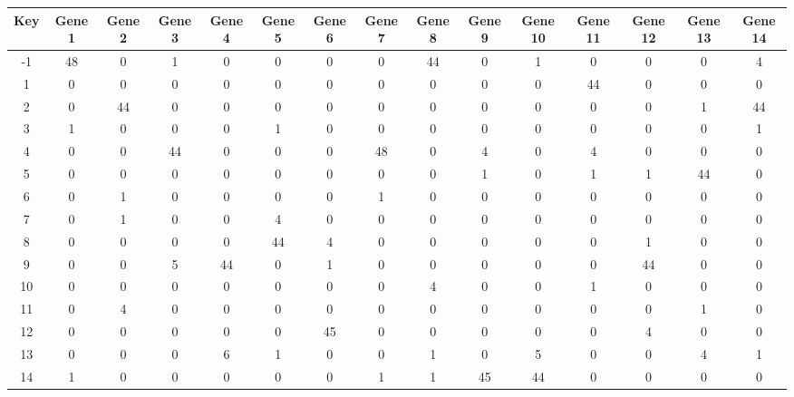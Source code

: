\begin{tabular}{|c|c|c|c|c|c|c|c|c|c|c|c|c|c|c|}
\hline
Key & Gene 1 & Gene 2 & Gene 3 & Gene 4 & Gene 5 & Gene 6 & Gene 7 & Gene 8 & Gene 9 & Gene 10 & Gene 11 & Gene 12 & Gene 13 & Gene 14 \\
\hline
-1 & 48 & 0 & 1 & 0 & 0 & 0 & 0 & 44 & 0 & 1 & 0 & 0 & 0 & 4 \\
1 & 0 & 0 & 0 & 0 & 0 & 0 & 0 & 0 & 0 & 0 & 44 & 0 & 0 & 0 \\
2 & 0 & 44 & 0 & 0 & 0 & 0 & 0 & 0 & 0 & 0 & 0 & 0 & 1 & 44 \\
3 & 1 & 0 & 0 & 0 & 1 & 0 & 0 & 0 & 0 & 0 & 0 & 0 & 0 & 1 \\
4 & 0 & 0 & 44 & 0 & 0 & 0 & 48 & 0 & 4 & 0 & 4 & 0 & 0 & 0 \\
5 & 0 & 0 & 0 & 0 & 0 & 0 & 0 & 0 & 1 & 0 & 1 & 1 & 44 & 0 \\
6 & 0 & 1 & 0 & 0 & 0 & 0 & 1 & 0 & 0 & 0 & 0 & 0 & 0 & 0 \\
7 & 0 & 1 & 0 & 0 & 4 & 0 & 0 & 0 & 0 & 0 & 0 & 0 & 0 & 0 \\
8 & 0 & 0 & 0 & 0 & 44 & 4 & 0 & 0 & 0 & 0 & 0 & 1 & 0 & 0 \\
9 & 0 & 0 & 5 & 44 & 0 & 1 & 0 & 0 & 0 & 0 & 0 & 44 & 0 & 0 \\
10 & 0 & 0 & 0 & 0 & 0 & 0 & 0 & 4 & 0 & 0 & 1 & 0 & 0 & 0 \\
11 & 0 & 4 & 0 & 0 & 0 & 0 & 0 & 0 & 0 & 0 & 0 & 0 & 1 & 0 \\
12 & 0 & 0 & 0 & 0 & 0 & 45 & 0 & 0 & 0 & 0 & 0 & 4 & 0 & 0 \\
13 & 0 & 0 & 0 & 6 & 1 & 0 & 0 & 1 & 0 & 5 & 0 & 0 & 4 & 1 \\
14 & 1 & 0 & 0 & 0 & 0 & 0 & 1 & 1 & 45 & 44 & 0 & 0 & 0 & 0 \\
\hline
\end{tabular}